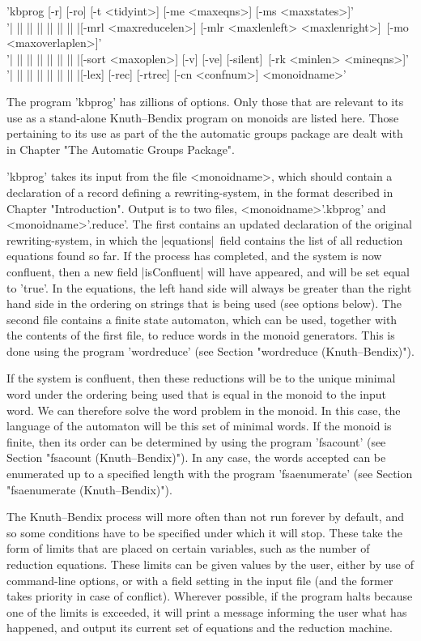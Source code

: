 
'kbprog  [-r] [-ro] [-t <tidyint>] [-me <maxeqns>] [-ms <maxstates>]'\\
'| || || || || || || |[-mrl <maxreducelen>] [-mlr <maxlenleft> <maxlenright>]\
[-mo <maxoverlaplen>]'\\
'| || || || || || || |[-sort <maxoplen>] [-v] [-ve] [-silent]\
[-rk <minlen> <mineqns>]'\\
'| || || || || || || |[-lex] [-rec] [-rtrec] [-cn <confnum>] <monoidname>'

The program 'kbprog' has zillions of options. Only those that are relevant
to its use as a stand-alone Knuth--Bendix program on monoids are listed here.
Those pertaining to its use as part of the the automatic groups package are
dealt with in Chapter "The Automatic Groups Package".

'kbprog' takes its input from the file <monoidname>, which should contain a
declaration of a record defining a rewriting-system, in the format described
in Chapter "Introduction". Output is to two files, <monoidname>'.kbprog' and
<monoidname>'.reduce'. The first contains an updated declaration of the
original rewriting-system, in which the |equations|\ field contains the
list of all reduction equations found so far. If the process has completed,
and the system is now confluent, then a new field |isConfluent| will
have appeared, and will be set equal to 'true'. In the equations,
the left hand side will always be greater than the right hand side in the
ordering on strings that is being used (see options below).
The second file contains a finite state automaton,
which can be used, together with the contents of the first file,
to reduce words in the monoid generators. This is done using the
program 'wordreduce' (see Section "wordreduce (Knuth--Bendix)").

If the system is confluent, then these reductions will be to the unique
minimal word under the ordering being used that is equal in the monoid to the
input word. We can therefore solve the word problem in the monoid. In this
case, the language of the automaton will be this set of minimal words.
If the monoid is finite, then its order can be determined by using the
program 'fsacount' (see Section "fsacount (Knuth--Bendix)").
In any case, the words accepted
can be enumerated up to a specified length with the program 'fsaenumerate'
(see Section "fsaenumerate (Knuth--Bendix)").

The Knuth--Bendix process will more often than not run forever by default,
and so some conditions have to be specified under which it will stop.
These take the form of limits that are placed on certain variables,
such as the number of reduction equations. 
These limits can be given values by the user, either by use of command-line
options, or with a field setting in the input file
(and the former takes priority in case of conflict).
Wherever possible, if the program halts because one of the limits is exceeded,
it will print a message informing the user what has happened,
and output its current set of equations and the reduction machine.

